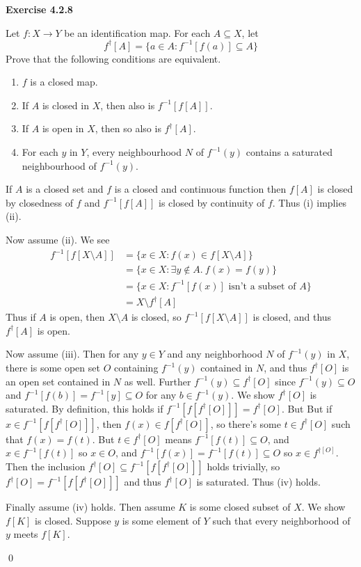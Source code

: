 \documentclass[12pt]{article}
\newcommand{\qcolor}{Gray}
\newcommand{\acolor}{Black}
\newcommand{\question}[1]{
	\color{\qcolor} 
	\item[#1~]}
\newcommand{\answer}[0]{
	\color{\acolor} 
	\item[]}
\newenvironment{exercise}[1]
{
	{
		\Large
		\color{\acolor}
		\addtolength\leftskip{-2em}
		\textbf{Exercise #1}
		
	}
	\begin{list}{}
	{
		\setlength\leftmargin{1em}
		\setlength\rightmargin{0em}
		\setlength\labelwidth{2em}
		\setlength\itemsep{0em}
		\setlength\parsep{0.5em}
		\setlength\baselineskip{1.25em}
	}
}
{
  \qed{}
  \end{list}
}
\begin{document}
\begin{exercise}{4.2.8}
  \question{} Let $f : X \to Y$ be an identification map. For each $A \subseteq X$, let
  $$f^\dagger [A] = \{ a \in A : f^{-1}[f(a)] \subseteq A \}$$
  Prove that the following conditions are equivalent.
  \begin{enumerate}[label=(\roman*)]
  \item $f$ is a closed map.
  \item If $A$ is closed in $X$, then also is $f^{-1}[f[A]]$.
  \item If $A$ is open in $X$, then so also is $f^\dagger [A]$.
  \item For each $y$ in $Y$, every neighbourhood $N$ of $f^{-1}(y)$ contains a saturated neighbourhood of $f^{-1}(y)$.
  \end{enumerate}
  \answer
  If $A$ is a closed set and $f$ is a closed and continuous function then $f[A]$ is closed by closedness of $f$ and $f^{-1}[f[A]]$ is closed by continuity of $f$. Thus (i) implies (ii).

  Now assume (ii). We see
  \begin{align*}
    f^{-1}[f[X \setminus A]] &= \{ x \in X : f(x) \in f[X \setminus A] \} \\
                             &= \{ x \in X : \exists y \notin A.\ f(x) = f(y) \} \\
                             &= \{ x \in X : f^{-1}[f(x)] \text{ isn't a subset of } A \} \\
                             &= X \setminus f^\dagger [A]
  \end{align*}
  Thus if $A$ is open, then $X \setminus A$ is closed, so $f^{-1}[f[X \setminus A]]$ is closed, and thus $f^\dagger [A]$ is open.

  Now assume (iii). Then for any $y \in Y$ and any neighborhood $N$ of $f^{-1}(y)$ in $X$, there is some open set $O$ containing $f^{-1}(y)$ contained in $N$, and thus $f^{\dagger}[O]$ is an open set contained in $N$ as well. Further $f^{-1}(y) \subseteq f^{\dagger}[O]$ since $f^{-1}(y) \subseteq O$ and $f^{-1}[f(b)] = f^{-1}[y] \subseteq O$ for any $b \in f^{-1}(y)$. We show $f^{\dagger}[O]$ is saturated. By definition, this holds if $f^{-1}[f[f^{\dagger}[O]]] = f^{\dagger}[O]$. But But if $x \in f^{-1}[f[f^{\dagger}[O]]]$, then $f(x) \in f[f^{\dagger}[O]]$, so there's some $t \in f^{\dagger}[O]$ such that $f(x) = f(t)$. But $t \in f^{\dagger}[O]$ means $f^{-1}[f(t)] \subseteq O$, and $x \in f^{-1}[f(t)]$ so $x \in O$, and $f^{-1}[f(x)] = f^{-1}[f(t)] \subseteq O$ so $x \in f^{\dagger[O]}$. Then the inclusion $f^{\dagger}[O] \subseteq f^{-1}[f[f^{\dagger}[O]]]$ holds trivially, so $f^{\dagger}[O] = f^{-1}[f[f^{\dagger}[O]]]$ and thus $f^{\dagger}[O]$ is saturated. Thus (iv) holds. 

  Finally assume (iv) holds. Then assume $K$ is some closed subset of $X$. We show $f[K]$ is closed. Suppose $y$ is some element of $Y$ such that every neighborhood of $y$ meets $f[K]$. 
\end{exercise}
\end{document}

